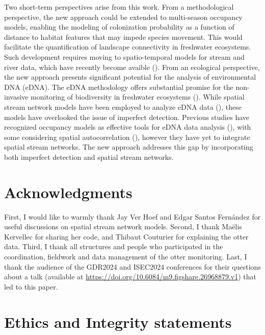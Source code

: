 \documentclass[
  11pt,
  a4paper,
]{article}
\begin{document}
Two short-term perspectives arise from this work. From a methodological perspective, the new approach could be extended to multi-season occupancy models, enabling the modeling of colonization probability as a function of distance to habitat features that may impede species movement. This would facilitate the quantification of landscape connectivity in freshwater ecosystems. Such development requires moving to spatio-temporal models for stream and river data, which have recently become avaible (). From an ecological perspective, the new approach presents significant potential for the analysis of environmental DNA (eDNA). The eDNA methodology offers substantial promise for the non-invasive monitoring of biodiversity in freshwater ecosystems (). While spatial stream network models have been employed to analyze eDNA data (), these models have overlooked the issue of imperfect detection. Previous studies have recognized occupancy models as effective tools for eDNA data analysis (), with some considering spatial autocorrelation (), however they have yet to integrate spatial stream networks. The new approach addresses this gap by incorporating both imperfect detection and spatial stream networks.

\section{Acknowledgments}\label{acknowledgments}

First, I would like to warmly thank Jay Ver Hoef and Edgar Santos Fernández for useful discussions on spatial stream network models. Second, I thank Maëlis Kervellec for sharing her code, and Thibaut Couturier for explaining the otter data. Third, I thank all structures and people who participated in the coordination, fieldwork and data management of the otter monitoring. Last, I thank the audience of the GDR2024 and ISEC2024 conferences for their questions about a talk (available at \url{https://doi.org/10.6084/m9.figshare.26968879.v1}) that led to this paper.

\section{Ethics and Integrity statements}\label{ethics-and-integrity-statements}
\end{document}

